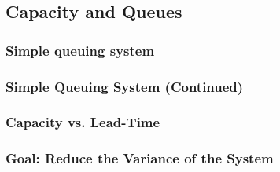 \subsection{Capacity and Queues}
\subsubsection{Simple queuing system}
\subsubsection{Simple Queuing System (Continued)}
\subsubsection{Capacity vs. Lead-Time}\subsubsection{Goal: Reduce the Variance of the System }
